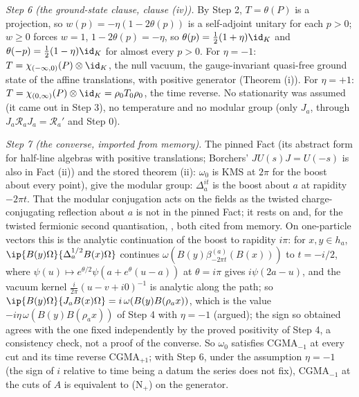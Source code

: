\emph{Step 6 (the ground-state clause, clause (iv)).} By Step 2, $T = \theta(P)$ is a projection, so $w(p) = -\eta(1 - 2\theta(p))$ is a self-adjoint unitary for each $p > 0$; $w \ge 0$ forces $w = 1$, $1 - 2\theta(p) = -\eta$, so $\theta(p) = \tfrac12(1 + \eta)\id_{K}$ and $\theta(-p) = \tfrac12(1 - \eta)\id_{K}$ for almost every $p > 0$. For $\eta = -1$: $T = \chi_{(-\infty, 0)}(P)\otimes\id_{K}$, the null vacuum, the gauge-invariant quasi-free ground state of the affine translations, with positive generator (Theorem (i)). For $\eta = +1$: $T = \chi_{(0, \infty)}(P)\otimes\id_{K} = \rho_{0}T_{0}\rho_{0}$, the time reverse. No stationarity was assumed (it came out in Step 3), no temperature and no modular group (only $J_{a}$, through $J_{a}\mathcal{R}_{a}J_{a} = \mathcal{R}_{a}'$ and Step 0).

\emph{Step 7 (the converse, imported from memory).} The pinned Fact  (its abstract form for half-line algebras with positive translations; Borchers' $JU(s)J = U(-s)$ is also in Fact (ii)) and the stored theorem (ii): $\omega_{0}$ is KMS at $2\pi$ for the boost about every point), give the modular group: $\Delta_{a}^{it}$ is the boost about $a$ at rapidity $-2\pi t$. That the modular conjugation acts on the fields as the twisted charge-conjugating reflection about $a$ is not in the pinned Fact; it rests on \cite{BGL1993} and, for the twisted fermionic second quantisation, \cite{BJL2002}, both cited from memory. On one-particle vectors this is the analytic continuation of the boost to rapidity $i\pi$: for $x, y \in h_{a}$, $\ip{B(y)\Omega}{\Delta_{a}^{1/2}B(x)\Omega}$ continues $\omega(B(y)\beta^{(a)}_{-2\pi t}(B(x)))$ to $t = -i/2$, where $\psi(u) \mapsto e^{\theta/2}\psi(a + e^{\theta}(u - a))$ at $\theta = i\pi$ gives $i\psi(2a - u)$, and the vacuum kernel $\tfrac{i}{2\pi}(u - v + i0)^{-1}$ is analytic along the path; so $\ip{B(y)\Omega}{J_{a}B(x)\Omega} = i\,\omega(B(y)B(\rho_{a}x))$, which is the value $-i\eta\,\omega(B(y)B(\rho_{a}x))$ of Step 4 with $\eta = -1$ (argued); the sign so obtained agrees with the one fixed independently by the proved positivity of Step 4, a consistency check, not a proof of the converse. So $\omega_{0}$ satisfies CGMA$_{-1}$ at every cut and its time reverse CGMA$_{+1}$; with Step 6, under the assumption $\eta = -1$ (the sign of $i$ relative to time being a datum the series does not fix), CGMA$_{-1}$ at the cuts of $A$ is equivalent to (N$_{+}$) on the generator.

